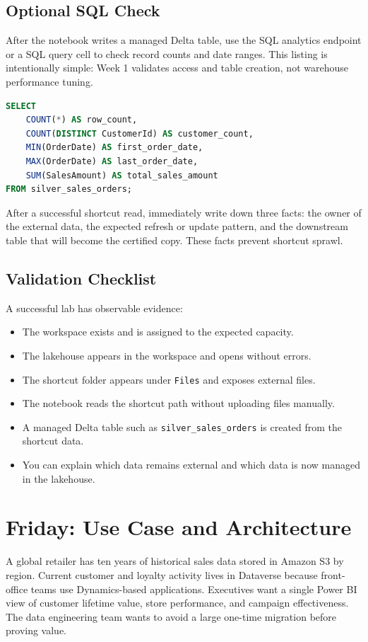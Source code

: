 \subsection{Optional SQL Check}
After the notebook writes a managed Delta table, use the SQL analytics endpoint or a SQL query cell to check record counts and date ranges. This listing is intentionally simple: Week 1 validates access and table creation, not warehouse performance tuning.

\begin{lstlisting}[language=SQL,caption={SQL validation after writing a managed Delta table from shortcut data.}]
SELECT
    COUNT(*) AS row_count,
    COUNT(DISTINCT CustomerId) AS customer_count,
    MIN(OrderDate) AS first_order_date,
    MAX(OrderDate) AS last_order_date,
    SUM(SalesAmount) AS total_sales_amount
FROM silver_sales_orders;
\end{lstlisting}

\begin{tipbox}
After a successful shortcut read, immediately write down three facts: the owner of the external data, the expected refresh or update pattern, and the downstream table that will become the certified copy. These facts prevent shortcut sprawl.
\end{tipbox}

\subsection{Validation Checklist}
A successful lab has observable evidence:
\begin{itemize}
    \item The workspace exists and is assigned to the expected capacity.
    \item The lakehouse appears in the workspace and opens without errors.
    \item The shortcut folder appears under \texttt{Files} and exposes external files.
    \item The notebook reads the shortcut path without uploading files manually.
    \item A managed Delta table such as \texttt{silver\_sales\_orders} is created from the shortcut data.
    \item You can explain which data remains external and which data is now managed in the lakehouse.
\end{itemize}

\section{Friday: Use Case and Architecture}
A global retailer has ten years of historical sales data stored in Amazon S3 by region. Current customer and loyalty activity lives in Dataverse because front-office teams use Dynamics-based applications. Executives want a single Power BI view of customer lifetime value, store performance, and campaign effectiveness. The data engineering team wants to avoid a large one-time migration before proving value.

